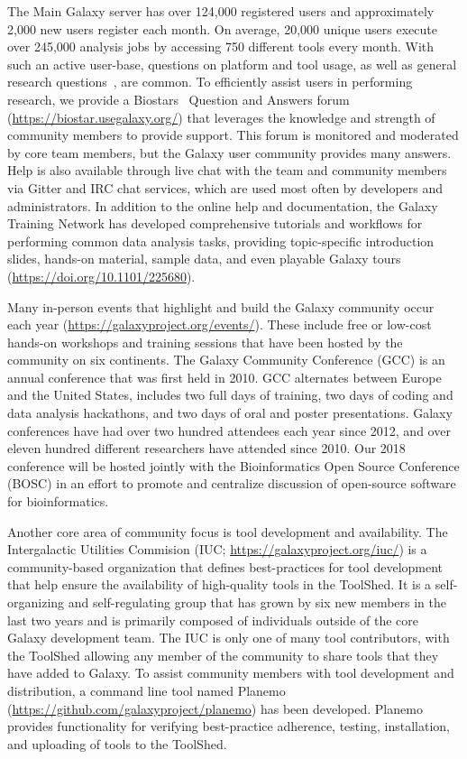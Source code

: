 The Main Galaxy server has over 124,000 registered users and approximately 2,000 new users register each month. On average, 20,000 unique users execute over 245,000 analysis jobs by accessing 750 different tools every month. With such an active user-base, questions on platform and tool usage, as well as general research questions~\cite{blankenberg2015online}, are common. To efficiently assist users in performing research, we provide a Biostars~\cite{parnell2011biostar} Question and Answers forum (\url{https://biostar.usegalaxy.org/}) that leverages the knowledge and strength of community members to provide support. This forum is monitored and moderated by core team members, but the Galaxy user community provides many answers. Help is also available through live chat with the team and community members via Gitter and IRC chat services, which are used most often by developers and administrators. In addition to the online help and documentation, the Galaxy Training Network has developed comprehensive tutorials and workflows for performing common data analysis tasks, providing topic-specific introduction slides, hands-on material, sample data, and even playable Galaxy tours (\url{https://doi.org/10.1101/225680}).

Many in-person events that highlight and build the Galaxy community occur each year (\url{https://galaxyproject.org/events/}). These include free or low-cost hands-on workshops and training sessions that have been hosted by the community on six continents. The Galaxy Community Conference (GCC) is an annual conference that was first held in 2010. GCC alternates between Europe and the United States, includes two full days of training, two days of coding and data analysis hackathons, and two days of oral and poster presentations. Galaxy conferences have had over two hundred attendees each year since 2012, and over eleven hundred different researchers have attended since 2010. Our 2018 conference will be hosted jointly with the Bioinformatics Open Source Conference (BOSC) in an effort to promote and centralize discussion of open-source software for bioinformatics.

Another core area of community focus is tool development and availability. The Intergalactic Utilities Commision (IUC; \url{https://galaxyproject.org/iuc/}) is a community-based organization that defines best-practices for tool development that help ensure the availability of high-quality tools in the ToolShed. It is a self-organizing and self-regulating group that has grown by six new members in the last two years and is primarily composed of individuals outside of the core Galaxy development team. The IUC is only one of many tool contributors, with the ToolShed allowing any member of the community to share tools that they have added to Galaxy. To assist community members with tool development and distribution, a command line tool named Planemo (\url{https://github.com/galaxyproject/planemo}) has been developed. Planemo provides functionality for verifying best-practice adherence, testing, installation, and uploading of tools to the ToolShed.

